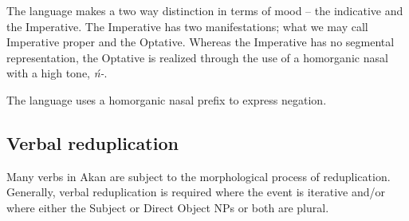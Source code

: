 \documentclass[output=paper]{langsci/langscibook}
\begin{document}
	\z
\z


The language makes a two way distinction in terms of mood -- the indicative and the Imperative. The Imperative has two manifestations; what we may call Imperative proper and the Optative. Whereas the Imperative has no segmental representation, the Optative is realized through the use of a homorganic nasal with a high tone, \textit{ń-}. 

\ea
\label{ex:10.osam}
	\z

	\z
\z

The language uses a homorganic nasal prefix to express negation.

\ea
\label{ex:12.osam}
	\z

	\z
\z

\subsection{Verbal reduplication}\label{§2.2:verbalreduplicaion.osam}

Many verbs in Akan are subject to the morphological process of reduplication. Generally, verbal reduplication is required where the event is iterative and/or where either the Subject or Direct Object NPs or both are plural.
\end{document}
